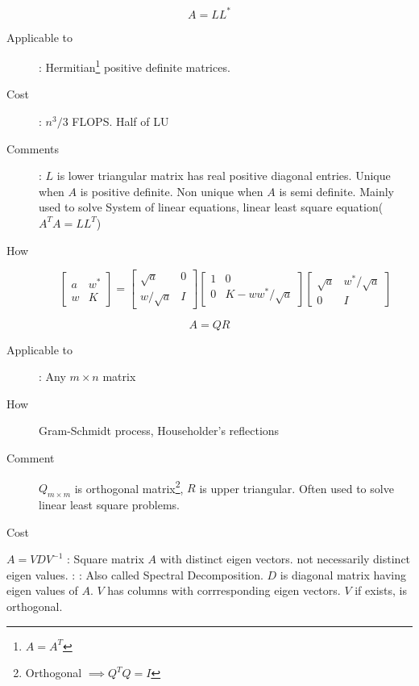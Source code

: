 \begin{slide}
   $$A = LL^*$$
   \begin{description}
   \item[Applicable to]: Hermitian\footnote{$A=A^T$} positive definite matrices. 
   \item[Cost]: $n^3/3$ FLOPS. Half of LU
   \item[Comments]: $L$ is lower triangular matrix has real positive diagonal entries. Unique when $A$ is positive definite. Non unique when $A$ is semi definite. Mainly used to solve System of linear equations, linear least square equation($A^TA=LL^T$)
   \item[How] 
   $$
   \begin{bmatrix} 
   a & w^{*}\\
   w&K
   \end{bmatrix}
   =
   \begin{bmatrix} 
   \sqrt{a} & 0\\
   w/\sqrt{a}&I
   \end{bmatrix}
   \begin{bmatrix} 
   1 & 0\\
   0&K-ww^{*}/\sqrt{a}
   \end{bmatrix}
   \begin{bmatrix} 
   \sqrt{a} & w^{*}/\sqrt{a}\\
   0&I
   \end{bmatrix}
   $$
   \end{description}
\end{slide}
\begin{slide}[ QR decomposition]
   $$ A = Q R$$
   \begin{description}
   \item[Applicable to]: Any $m\times n$ matrix
   \item[How] Gram-Schmidt process, Householder's reflections
   \item[Comment] $Q_{m\times m}$ is orthogonal matrix\footnote{Orthogonal $\implies Q^TQ=I$}, $R$ is upper triangular. Often used to solve linear least square problems.
   \item[Cost]
   \end{description}
\end{slide}
\begin{slide}
   $A = VDV^{-1} $
   : Square matrix $A$ with distinct eigen vectors. not necessarily distinct eigen values.
   : 
   :
    Also called Spectral Decomposition. $D$ is diagonal matrix having eigen values of $A$. $V$ has columns with corrresponding eigen vectors. $V$ if exists, is orthogonal.
\end{slide}
